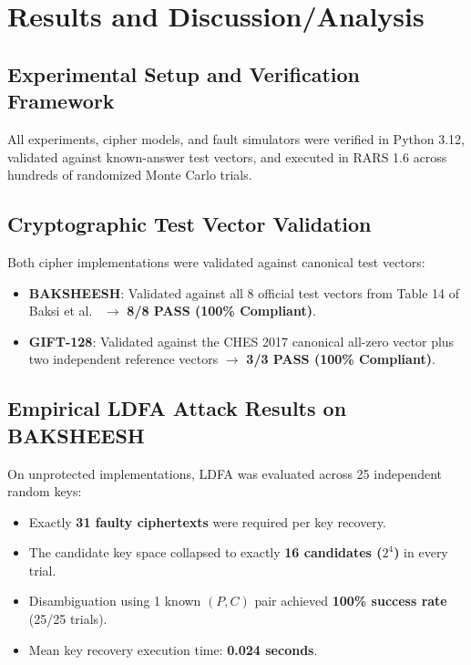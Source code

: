 \chapter{Results and Discussion/Analysis}
\label{ch:results}

\section{Experimental Setup and Verification Framework}
\label{sec:exp_setup}
All experiments, cipher models, and fault simulators were verified in Python 3.12, validated against known-answer test vectors, and executed in RARS 1.6 across hundreds of randomized Monte Carlo trials.

\section{Cryptographic Test Vector Validation}
\label{sec:test_vectors}
Both cipher implementations were validated against canonical test vectors:
\begin{itemize}
    \item \textbf{BAKSHEESH}: Validated against all 8 official test vectors from Table 14 of Baksi et al.~\cite{baksi2023baksheesh} $\to$ \textbf{8/8 PASS (100\% Compliant)}.
    \item \textbf{GIFT-128}: Validated against the CHES 2017 canonical all-zero vector plus two independent reference vectors $\to$ \textbf{3/3 PASS (100\% Compliant)}.
\end{itemize}

\section{Empirical LDFA Attack Results on BAKSHEESH}
\label{sec:exp_ldfa}
On unprotected implementations, LDFA was evaluated across 25 independent random keys:
\begin{itemize}
    \item Exactly \textbf{31 faulty ciphertexts} were required per key recovery.
    \item The candidate key space collapsed to exactly \textbf{16 candidates ($2^4$)} in every trial.
    \item Disambiguation using 1 known $(P, C)$ pair achieved \textbf{100\% success rate} (25/25 trials).
    \item Mean key recovery execution time: \textbf{0.024 seconds}.
\end{itemize}

